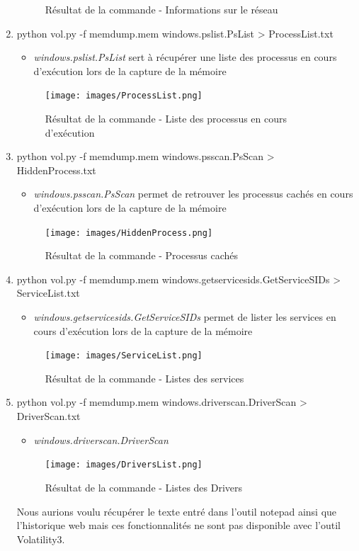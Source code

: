 \documentclass[a4paper]{article}
\begin{document}
\begin{enumerate}
\begin{figure}[H]
        \caption{Résultat de la commande - Informations sur le réseau}
        \label{networkinfo}
    \end{figure}
    \item python vol.py -f memdump.mem windows.pslist.PsList > ProcessList.txt
    \begin{itemize}
        \item \textit{windows.pslist.PsList} sert à récupérer une liste des processus en cours d'exécution lors de la capture de la mémoire
    \end{itemize}
    \begin{figure}[H]
        \centering
        \texttt{[image: images/ProcessList.png]}
        \caption{Résultat de la commande - Liste des processus en cours d'exécution}
        \label{processlist}
    \end{figure}
    \item python vol.py -f memdump.mem windows.psscan.PsScan > HiddenProcess.txt
    \begin{itemize}
        \item \textit{windows.psscan.PsScan} permet de retrouver les processus cachés en cours d'exécution lors de la capture de la mémoire
    \end{itemize}
    \begin{figure}[H]
        \centering
        \texttt{[image: images/HiddenProcess.png]}
        \caption{Résultat de la commande - Processus cachés}
        \label{hiddenprocess}
    \end{figure}
    \item python vol.py -f memdump.mem windows.getservicesids.GetServiceSIDs > ServiceList.txt
    \begin{itemize}
        \item \textit{windows.getservicesids.GetServiceSIDs} permet de lister les services en cours d'exécution lors de la capture de la mémoire
    \end{itemize}
    \begin{figure}[H]
        \centering
        \texttt{[image: images/ServiceList.png]}
        \caption{Résultat de la commande - Listes des services}
        \label{servicelist}
    \end{figure}
    \item python vol.py -f memdump.mem windows.driverscan.DriverScan > DriverScan.txt
    \begin{itemize}
        \item \textit{windows.driverscan.DriverScan}
    \end{itemize}
    \begin{figure}[H]
        \centering
        \texttt{[image: images/DriversList.png]}
        \caption{Résultat de la commande - Listes des Drivers}
        \label{driverslist}
    \end{figure}
    Nous aurions voulu récupérer le texte entré dans l'outil notepad ainsi que l'historique web mais ces fonctionnalités ne sont pas disponible avec l'outil Volatility3.
\end{enumerate}
\end{document}
